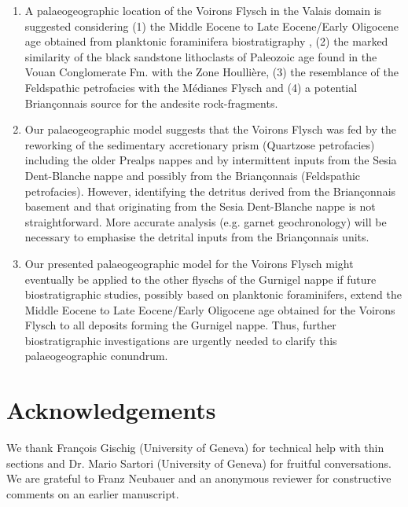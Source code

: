 \documentclass[twoside]{article}
\begin{document}
\begin{enumerate}
		\item A palaeogeographic location of the Voirons Flysch in the Valais domain is suggested considering (1) the Middle Eocene to Late Eocene/Early Oligocene age obtained from planktonic foraminifera biostratigraphy \citep{Ujetz1996,Ospina-Ostios2013}, (2) the marked similarity of the black sandstone lithoclasts of Paleozoic age found in the Vouan Conglomerate Fm. with the Zone Houllière, (3) the resemblance of the Feldspathic petrofacies with the Médianes Flysch and (4) a potential Briançonnais source for the andesite rock-fragments.
		\item Our palaeogeographic model suggests that the Voirons Flysch was fed by the reworking of the sedimentary accretionary prism (Quartzose petrofacies) including the older Prealps nappes and by intermittent inputs from the Sesia Dent-Blanche nappe and possibly from the Briançonnais (Feldspathic petrofacies). However, identifying the detritus derived from the Briançonnais basement and that originating from the Sesia Dent-Blanche nappe is not straightforward. More accurate analysis (e.g. garnet geochronology) will be necessary to emphasise the detrital inputs from the Briançonnais units.
		\item Our presented palaeogeographic model for the Voirons Flysch might eventually be applied to the other flyschs of the Gurnigel nappe if future biostratigraphic studies, possibly based on planktonic foraminifers, extend the Middle Eocene to Late Eocene/Early Oligocene age obtained for the Voirons Flysch to all deposits forming the Gurnigel nappe. Thus, further biostratigraphic investigations are urgently needed to clarify this palaeogeographic conundrum.
	\end{enumerate}

\section*{Acknowledgements}

We thank François Gischig (University of Geneva) for technical help with thin sections and Dr. Mario Sartori (University of Geneva) for fruitful conversations. We are grateful to Franz Neubauer and an anonymous reviewer for constructive comments on an earlier manuscript.



\end{document}
